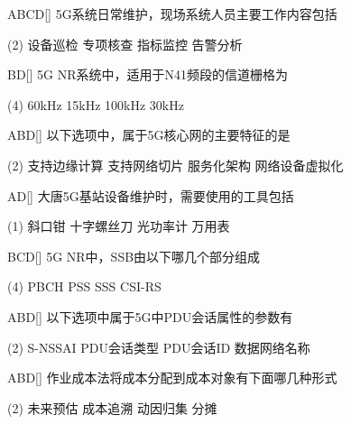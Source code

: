 \begin{choice}{\;ABCD\;}[]
    5G系统日常维护，现场系统人员主要工作内容包括
    \begin{tasks}(2)
        \task 设备巡检
        \task 专项核查
        \task 指标监控
        \task 告警分析
    \end{tasks}
\end{choice}

\begin{choice}{\;BD\;}[]
    5G NR系统中，适用于N41频段的信道栅格为
    \begin{tasks}(4)
        \task 60kHz
        \task 15kHz
        \task 100kHz
        \task 30kHz
    \end{tasks}
\end{choice}

\begin{choice}{\;ABD\;}[]
    以下选项中，属于5G核心网的主要特征的是
    \begin{tasks}(2)
        \task 支持边缘计算
        \task 支持网络切片
        \task 服务化架构
        \task 网络设备虚拟化
    \end{tasks}
\end{choice}

\begin{choice}{\;AD\;}[]
    大唐5G基站设备维护时，需要使用的工具包括
    \begin{tasks}(1)
        \task 斜口钳
        \task 十字螺丝刀
        \task  光功率计
        \task 万用表
    \end{tasks}
\end{choice}

\begin{choice}{\;BCD\;}[]
    5G NR中，SSB由以下哪几个部分组成
    \begin{tasks}(4)
        \task PBCH
        \task PSS
        \task SSS
        \task CSI-RS
    \end{tasks}
\end{choice}

\begin{choice}{\;ABD\;}[]
    以下选项中属于5G中PDU会话属性的参数有
    \begin{tasks}(2)
        \task S-NSSAI
        \task PDU会话类型
        \task PDU会话ID
        \task 数据网络名称
    \end{tasks}
\end{choice}

\begin{choice}{\;ABD\;}[]
    作业成本法将成本分配到成本对象有下面哪几种形式
    \begin{tasks}(2)
        \task 未来预估
        \task 成本追溯
        \task 动因归集
        \task 分摊
    \end{tasks}
\end{choice}

